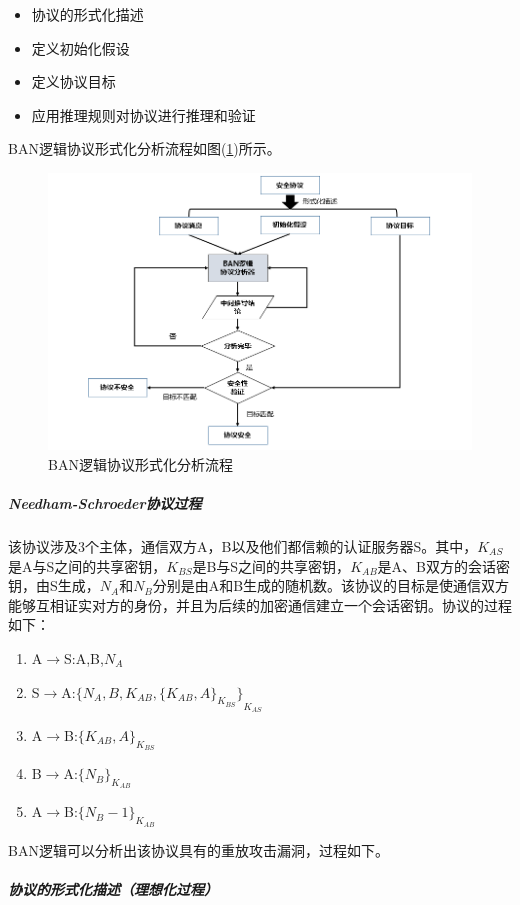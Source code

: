 \documentclass[cs4size,a4pape,UTF8]{ctexart}
\numberwithin{equation}{section}
\numberwithin{table}{section}
\numberwithin{figure}{section}
\begin{document}
\begin{itemize}
\item 协议的形式化描述
\item 定义初始化假设
\item 定义协议目标
\item 应用推理规则对协议进行推理和验证
\end{itemize}

BAN逻辑协议形式化分析流程如图(\ref{fig:3})所示。

\begin{figure}[h!]
\centering
\includegraphics[width=0.8\linewidth]{figure/3}
\caption{BAN逻辑协议形式化分析流程}
\label{fig:3}
\end{figure}

\subparagraph{Needham-Schroeder协议过程}

该协议涉及3个主体，通信双方A，B以及他们都信赖的认证服务器S。其中，$K_{AS}$是A与S之间的共享密钥，$K_{BS}$是B与S之间的共享密钥，$K_{AB}$是A、B双方的会话密钥，由S生成，$N_{A}$和$N_{B}$分别是由A和B生成的随机数。该协议的目标是使通信双方能够互相证实对方的身份，并且为后续的加密通信建立一个会话密钥。协议的过程如下：

\begin{enumerate}[(1)]
\item A$\to$S:A,B,$N_{A}$
\item S$\to$A:${\{N_{A},B,K_{AB},{\{K_{AB},A\}}_{K_{BS}}\}}_{K_{AS}}$
\item A$\to$B:${\{K_{AB},A\}}_{K_{BS}}$
\item B$\to$A:${\{N_{B}\}}_{K_{AB}}$
\item A$\to$B:${\{N_{B}-1\}}_{K_{AB}}$
\end{enumerate}

BAN逻辑可以分析出该协议具有的重放攻击漏洞，过程如下。

\subparagraph{协议的形式化描述（理想化过程）}\
\end{document}

